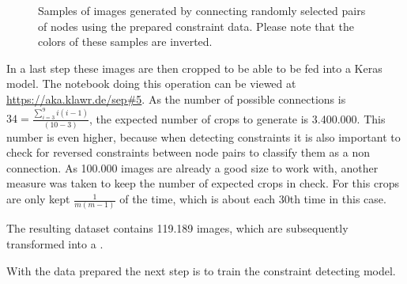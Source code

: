 \begin{figure}
\begin{subfigure}[b]{0.19\textwidth}
    \end{subfigure}
    \begin{subfigure}[b]{0.19\textwidth}
    \end{subfigure}
    \caption{Samples of images generated by connecting randomly selected pairs of nodes using the prepared constraint data. Please note that the colors of these samples are inverted.}
\end{figure}

In a last step these images are then cropped to be able to be fed into a Keras model.
The notebook doing this operation can be viewed at \url{https://aka.klawr.de/sep\#5}.
As the number of possible connections is $34 = \frac{\sum_{i=3}^{9}i(i-1)}{(10-3)}$, the expected number of crops to generate is 3.400.000.
This number is even higher, because when detecting constraints it is also important to check for reversed constraints between node pairs to classify them as a non connection.
As 100.000 images are already a good size to work with, another measure was taken to keep the number of expected crops in check.
For this crops are only kept $\frac{1}{m(m-1)}$ of the time, which is about each 30th time in this case.

The resulting dataset contains 119.189 images, which are subsequently transformed into a .

With the data prepared the next step is to train the constraint detecting model.